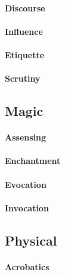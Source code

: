 \paragraph{Discourse}

\paragraph{Influence}

\paragraph{Etiquette}

\paragraph{Scrutiny}


\subsection{Magic}

\paragraph{Assensing}

\paragraph{Enchantment}

\paragraph{Evocation}

\paragraph{Invocation}

\subsection{Physical}

\paragraph{Acrobatics}


